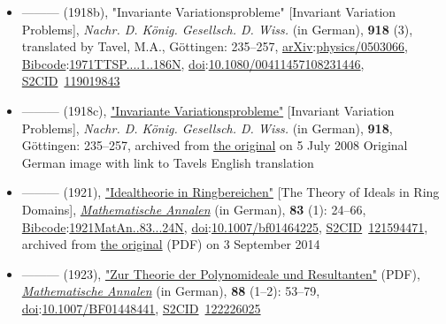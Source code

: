 \begin{itemize}
\item
  {---}{---}{---} (1918b), "Invariante Variationsprobleme" {{[}}Invariant Variation Problems{{]}}, \emph{Nachr. D. König. Gesellsch. D. Wiss.} (in German), \textbf{918} (3), translated by Tavel, M.A., Göttingen: {235--}257, \href{https://en.wikipedia.org/wiki/ArXiv_(identifier)}{arXiv}:{\href{https://arxiv.org/abs/physics/0503066}{physics/0503066}}, \href{https://en.wikipedia.org/wiki/Bibcode_(identifier)}{Bibcode}:\href{https://ui.adsabs.harvard.edu/abs/1971TTSP....1..186N}{1971TTSP....1..186N}, \href{https://en.wikipedia.org/wiki/Doi_(identifier)}{doi}:\href{https://doi.org/10.1080\%2F00411457108231446}{10.1080/00411457108231446}, \href{https://en.wikipedia.org/wiki/S2CID_(identifier)}{S2CID}{~}\href{https://api.semanticscholar.org/CorpusID:119019843}{119019843}{}
\item
  {---}{---}{---} (1918c), \href{https://web.archive.org/web/20080705175409/http://www.physics.ucla.edu/~cwp/articles/noether.trans/german/emmy235.html}{"Invariante Variationsprobleme"} {{[}}Invariant Variation Problems{{]}}, \emph{Nachr. D. König. Gesellsch. D. Wiss.} (in German), \textbf{918}, Göttingen: {235--}257, archived from \href{http://www.physics.ucla.edu/~cwp/articles/noether.trans/german/emmy235.html}{the original} on 5 July 2008{} Original German image with link to Tavel\textquotesingle s English translation
\item
  {---}{---}{---} (1921), \href{https://web.archive.org/web/20140903092135/http://gdz.sub.uni-goettingen.de/index.php?id=11&PPN=GDZPPN002267829&L=1}{"Idealtheorie in Ringbereichen"} {{[}}The Theory of Ideals in Ring Domains{{]}}, \emph{\href{https://en.wikipedia.org/wiki/Mathematische_Annalen}{Mathematische Annalen}} (in German), \textbf{83} (1): {24--}66, \href{https://en.wikipedia.org/wiki/Bibcode_(identifier)}{Bibcode}:\href{https://ui.adsabs.harvard.edu/abs/1921MatAn..83...24N}{1921MatAn..83...24N}, \href{https://en.wikipedia.org/wiki/Doi_(identifier)}{doi}:\href{https://doi.org/10.1007\%2Fbf01464225}{10.1007/bf01464225}, \href{https://en.wikipedia.org/wiki/S2CID_(identifier)}{S2CID}{~}\href{https://api.semanticscholar.org/CorpusID:121594471}{121594471}, archived from \href{http://gdz.sub.uni-goettingen.de/index.php?id=11&PPN=GDZPPN002267829&L=1}{the original} {(PDF)} on 3 September 2014{}
\item
  {---}{---}{---} (1923), \href{http://www.digizeitschriften.de/download/PPN235181684_0088/log7.pdf}{"Zur Theorie der Polynomideale und Resultanten"} {(PDF)}, \emph{\href{https://en.wikipedia.org/wiki/Mathematische_Annalen}{Mathematische Annalen}} (in German), \textbf{88} ({1--}2): {53--}79, \href{https://en.wikipedia.org/wiki/Doi_(identifier)}{doi}:\href{https://doi.org/10.1007\%2FBF01448441}{10.1007/BF01448441}, \href{https://en.wikipedia.org/wiki/S2CID_(identifier)}{S2CID}{~}\href{https://api.semanticscholar.org/CorpusID:122226025}{122226025}{}

\end{itemize}

